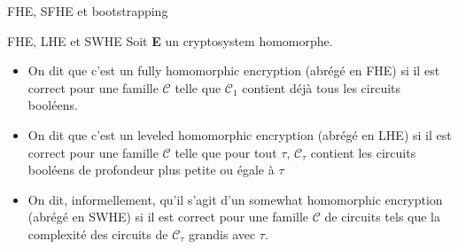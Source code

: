 \begin{section}{FHE, SFHE et bootstrapping}
\begin{definition}{FHE, LHE et SWHE}
Soit \textbf{E} un cryptosystem homomorphe.
\begin{itemize}
\item On dit que c'est un fully homomorphic encryption (abrégé en FHE) si il est correct pour
une famille $\mathcal{C}$ telle que $\mathcal{C_1}$ contient déjà tous les
circuits booléens. 
\item On dit que c'est un  leveled homomorphic encryption (abrégé en LHE)  si il est correct pour une famille
$\mathcal{C}$ telle que pour tout $\tau$, $\mathcal{C}_\tau$ contient les
circuits booléens de profondeur plus petite ou égale à $\tau$ 
\item On dit, informellement, qu'il s'agit d'un somewhat homomorphic encryption
(abrégé en SWHE) si il est correct pour une famille $\mathcal{C}$ de circuits
tels que la complexité des circuits de $\mathcal{C}_\tau$ grandis avec $\tau$.
\end{itemize}
\end{definition}







\end{section}

